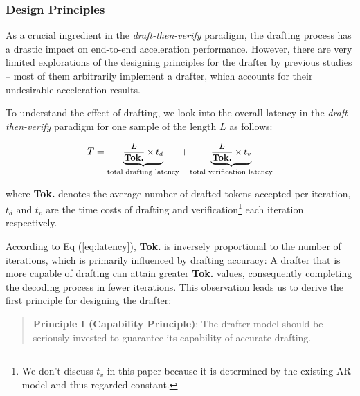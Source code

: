 \subsubsection{Design Principles}

As a crucial ingredient in the \textit{draft-then-verify} paradigm, the drafting process has a drastic impact on end-to-end acceleration performance. However, there are very limited explorations of the designing principles for the drafter by previous studies -- most of them arbitrarily implement a drafter, which accounts for their undesirable acceleration results.

To understand the effect of drafting, we look into the overall latency in the \textit{draft-then-verify} paradigm for one sample of the length $L$ as follows:

\begin{equation}\label{eq:latency}\small
T = \underbrace{\frac{L}{\textrm{\bf Tok.}}\times t_d}_{{\footnotesize\raggedright \textrm{total drafting latency}}} + \underbrace{\frac{L}{\textrm{\bf Tok.}}\times t_v}_{{\footnotesize\raggedright \textrm{total verification latency}}}
\end{equation}

where \textbf{Tok.} denotes the average number of drafted tokens accepted per iteration, $t_d$ and $t_v$ are the time costs of drafting and verification\footnote{We don't discuss $t_v$ in this paper because it is determined by the existing AR model and thus regarded constant.} each iteration respectively.

According to Eq (\ref{eq:latency}), \textbf{Tok.} is inversely proportional to the number of iterations, which is primarily influenced by drafting accuracy: A drafter that is more capable of drafting can attain greater \textbf{Tok.} values, consequently completing the decoding process in fewer iterations. This observation leads us to derive the first principle for designing the drafter:

\begin{quote}
    \textbf{Principle I (Capability Principle)}: The drafter model should be seriously invested to guarantee its capability of accurate drafting.
\end{quote}

